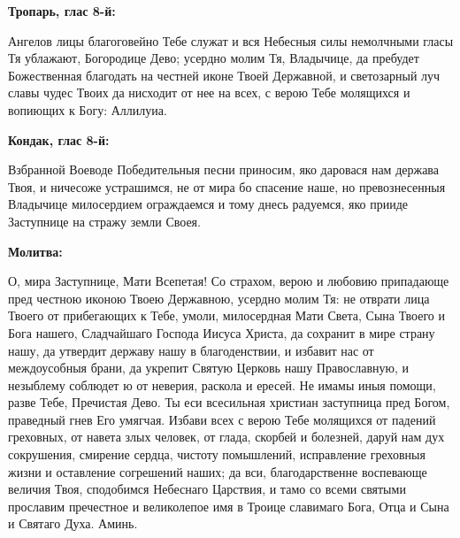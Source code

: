 
\vspace{-\baselineskip}
 

\bfseries Тропарь, глас 8-й:\normalfont{}\nopagebreak


Ангелов лицы благоговейно Тебе служат и вся Небесныя силы немолчными гласы Тя ублажают, Богородице Дево; усердно молим Тя, Владычице, да пребудет Божественная благодать на честней иконе Твоей Державной, и светозарный луч славы чудес Твоих да нисходит от нее на всех, с верою Тебе молящихся и вопиющих к Богу: Аллилуиа.


\medskip


\bfseries Кондак, глас 8-й:\normalfont{}\nopagebreak


Взбранной Воеводе Победительныя песни приносим, яко даровася нам держава Твоя, и ничесоже устрашимся, не от мира бо спасение наше, но превознесенныя Владычице милосердием ограждаемся и тому днесь радуемся, яко прииде Заступнице на стражу земли Своея.


\medskip


\bfseries Молитва:\normalfont{}\nopagebreak


О, мира Заступнице, Мати Всепетая! Со страхом, верою и любовию припадающе пред честною иконою Твоею Державною, усердно молим Тя: не отврати лица Твоего от прибегающих к Тебе, умоли, милосердная Мати Света, Сына Твоего и Бога нашего, Сладчайшаго Господа Иисуса Христа, да сохранит в мире страну нашу, да утвердит державу нашу в благоденствии, и избавит нас от междоусобныя брани, да укрепит Святую Церковь нашу Православную, и незыблему соблюдет ю от неверия, раскола и ересей. Не имамы иныя помощи, разве Тебе, Пречистая Дево. Ты еси всесильная христиан заступница пред Богом, праведный гнев Его умягчая. Избави всех с верою Тебе молящихся от падений греховных, от навета злых человек, от глада, скорбей и болезней, даруй нам дух сокрушения, смирение сердца, чистоту помышлений, исправление греховныя жизни и оставление согрешений наших; да вси, благодарственне воспевающе величия Твоя, сподобимся Небеснаго Царствия, и тамо со всеми святыми прославим пречестное и великолепое имя в Троице славимаго Бога, Отца и Сына и Святаго Духа. Аминь.


\longpage{}\medskip\mychapterending

 
